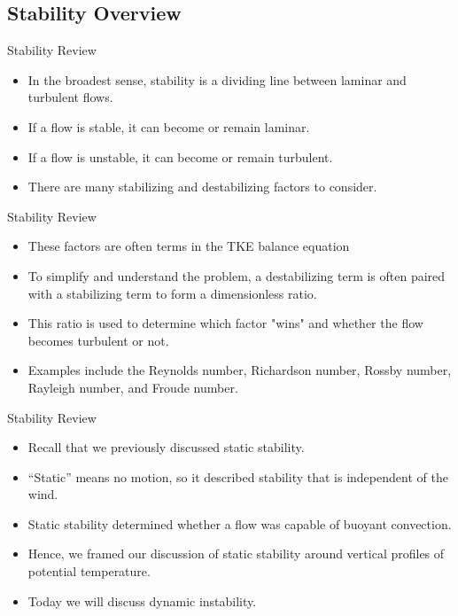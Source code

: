 \subsection{Stability Overview}
\begin{frame}{Stability Review}
\begin{itemize}
	\item In the broadest sense, stability is a dividing line between laminar and turbulent flows.
	\item If a flow is stable, it can become or remain laminar.
	\item If a flow is unstable, it can become or remain turbulent.
	\item There are many stabilizing and destabilizing factors to consider.
\end{itemize}
\end{frame}
\begin{frame}{Stability Review}

\begin{itemize}
	\item These factors are often terms in the TKE balance equation
	\item To simplify and understand the problem, a destabilizing term is often paired with a stabilizing term to form a dimensionless ratio.
	\item This ratio is used to determine which factor "wins" and whether the flow becomes turbulent or not.
	\item Examples include the Reynolds number, Richardson number, Rossby number, Rayleigh number, and Froude number.
\end{itemize}
\end{frame}
\begin{frame}{Stability Review}
\begin{itemize}
	\item Recall that we previously discussed static stability.
	\item ``Static'' means no motion, so it described stability that is independent of the wind.
	\item Static stability determined whether a flow was capable of buoyant convection.
	\item Hence, we framed our discussion of static stability around vertical profiles of potential temperature.
	\item  Today we will discuss dynamic instability.  
\end{itemize}
\end{frame}
